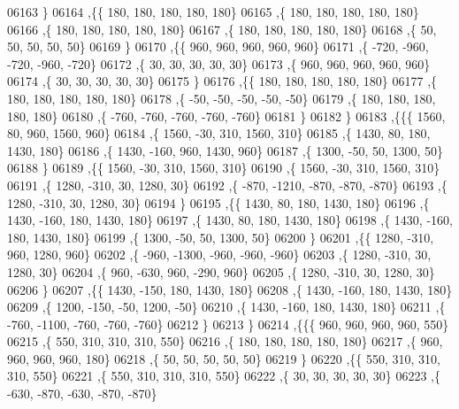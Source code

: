 \begin{DoxyCode}
06163     \}
06164    ,\{\{   180,   180,   180,   180,   180\}
06165     ,\{   180,   180,   180,   180,   180\}
06166     ,\{   180,   180,   180,   180,   180\}
06167     ,\{   180,   180,   180,   180,   180\}
06168     ,\{    50,    50,    50,    50,    50\}
06169     \}
06170    ,\{\{   960,   960,   960,   960,   960\}
06171     ,\{  -720,  -960,  -720,  -960,  -720\}
06172     ,\{    30,    30,    30,    30,    30\}
06173     ,\{   960,   960,   960,   960,   960\}
06174     ,\{    30,    30,    30,    30,    30\}
06175     \}
06176    ,\{\{   180,   180,   180,   180,   180\}
06177     ,\{   180,   180,   180,   180,   180\}
06178     ,\{   -50,   -50,   -50,   -50,   -50\}
06179     ,\{   180,   180,   180,   180,   180\}
06180     ,\{  -760,  -760,  -760,  -760,  -760\}
06181     \}
06182    \}
06183   ,\{\{\{  1560,    80,   960,  1560,   960\}
06184     ,\{  1560,   -30,   310,  1560,   310\}
06185     ,\{  1430,    80,   180,  1430,   180\}
06186     ,\{  1430,  -160,   960,  1430,   960\}
06187     ,\{  1300,   -50,    50,  1300,    50\}
06188     \}
06189    ,\{\{  1560,   -30,   310,  1560,   310\}
06190     ,\{  1560,   -30,   310,  1560,   310\}
06191     ,\{  1280,  -310,    30,  1280,    30\}
06192     ,\{  -870, -1210,  -870,  -870,  -870\}
06193     ,\{  1280,  -310,    30,  1280,    30\}
06194     \}
06195    ,\{\{  1430,    80,   180,  1430,   180\}
06196     ,\{  1430,  -160,   180,  1430,   180\}
06197     ,\{  1430,    80,   180,  1430,   180\}
06198     ,\{  1430,  -160,   180,  1430,   180\}
06199     ,\{  1300,   -50,    50,  1300,    50\}
06200     \}
06201    ,\{\{  1280,  -310,   960,  1280,   960\}
06202     ,\{  -960, -1300,  -960,  -960,  -960\}
06203     ,\{  1280,  -310,    30,  1280,    30\}
06204     ,\{   960,  -630,   960,  -290,   960\}
06205     ,\{  1280,  -310,    30,  1280,    30\}
06206     \}
06207    ,\{\{  1430,  -150,   180,  1430,   180\}
06208     ,\{  1430,  -160,   180,  1430,   180\}
06209     ,\{  1200,  -150,   -50,  1200,   -50\}
06210     ,\{  1430,  -160,   180,  1430,   180\}
06211     ,\{  -760, -1100,  -760,  -760,  -760\}
06212     \}
06213    \}
06214   ,\{\{\{   960,   960,   960,   960,   550\}
06215     ,\{   550,   310,   310,   310,   550\}
06216     ,\{   180,   180,   180,   180,   180\}
06217     ,\{   960,   960,   960,   960,   180\}
06218     ,\{    50,    50,    50,    50,    50\}
06219     \}
06220    ,\{\{   550,   310,   310,   310,   550\}
06221     ,\{   550,   310,   310,   310,   550\}
06222     ,\{    30,    30,    30,    30,    30\}
06223     ,\{  -630,  -870,  -630,  -870,  -870\}

\end{DoxyCode}
